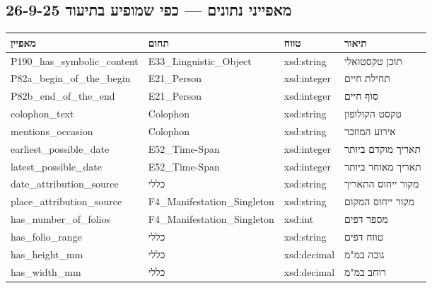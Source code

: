\documentclass[12pt,a4paper]{article}
\newcommand{\en}[1]{\textenglish{\LR{#1}}}
\begin{document}
\subsection{מאפייני נתונים \en{(Data Properties)} — כפי שמופיע בתיעוד 26-9-25}

{\small
\begin{longtable}{|p{4cm}|p{3.5cm}|p{3.5cm}|p{4.5cm}|}
\hline
\textbf{מאפיין} & \textbf{תחום} & \textbf{טווח} & \textbf{תיאור} \\
\hline
\endhead

\textenglish{P190\_has\_symbolic\_content} & \textenglish{E33\_Linguistic\_Object} & \textenglish{xsd:string} & תוכן טקסטואלי \\
\hline
\textenglish{P82a\_begin\_of\_the\_begin} & \textenglish{E21\_Person} & \textenglish{xsd:integer} & תחילת חיים \\
\hline
\textenglish{P82b\_end\_of\_the\_end} & \textenglish{E21\_Person} & \textenglish{xsd:integer} & סוף חיים \\
\hline
\textenglish{colophon\_text} & \textenglish{Colophon} & \textenglish{xsd:string} & טקסט הקולופון \\
\hline
\textenglish{mentions\_occasion} & \textenglish{Colophon} & \textenglish{xsd:string} & אירוע המוזכר \\
\hline
\textenglish{earliest\_possible\_date} & \textenglish{E52\_Time-Span} & \textenglish{xsd:integer} & תאריך מוקדם ביותר \\
\hline
\textenglish{latest\_possible\_date} & \textenglish{E52\_Time-Span} & \textenglish{xsd:integer} & תאריך מאוחר ביותר \\
\hline
\textenglish{date\_attribution\_source} & כללי & \textenglish{xsd:string} & מקור ייחוס התאריך \\
\hline
\textenglish{place\_attribution\_source} & \textenglish{F4\_Manifestation\_Singleton} & \textenglish{xsd:string} & מקור ייחוס המקום \\
\hline
\textenglish{has\_number\_of\_folios} & \textenglish{F4\_Manifestation\_Singleton} & \textenglish{xsd:int} & מספר דפים \\
\hline
\textenglish{has\_folio\_range} & כללי & \textenglish{xsd:string} & טווח דפים \\
\hline
\textenglish{has\_height\_mm} & כללי & \textenglish{xsd:decimal} & גובה במ"מ \\
\hline
\textenglish{has\_width\_mm} & כללי & \textenglish{xsd:decimal} & רוחב במ"מ \\

\end{longtable}}
\end{document}
